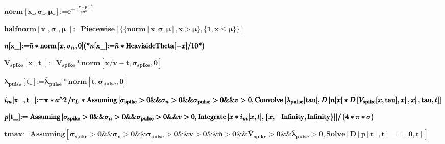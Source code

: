 \documentclass{article}
\begin{document}
\begin{doublespace}
\noindent\(\pmb{\text{norm}[\text{x$\_$},\sigma \_,\mu \_]\text{:=}e^{-\frac{(x-\mu )^2}{2 \sigma ^2}}}\)
\end{doublespace}

\begin{doublespace}
\noindent\(\pmb{\text{halfnorm}[\text{x$\_$},\sigma \_,\mu \_]\text{:=}\text{Piecewise}[\{\{\text{norm}[x,\sigma ,\mu ],x>\mu \},\{1,x\leq \mu \}\}]}\)
\end{doublespace}

\begin{doublespace}
\noindent\(\pmb{n[\text{x$\_$}]\text{:=}\bar{n}*\text{norm}\left[x,\sigma _n,0\right]}\\
\pmb{\text{(*}n[\text{x$\_$}]\text{:=}\bar{n}*\text{HeavisideTheta}[-x]/10\text{*)}}\)
\end{doublespace}

\begin{doublespace}
\noindent\(\pmb{V_{\text{spike}}[\text{x$\_$},\text{t$\_$}]\text{:=}\bar{V}_{\text{spike}}*\text{norm}\left[x/v-t,\sigma _{\text{spike}},0\right]}\)
\end{doublespace}

\begin{doublespace}
\noindent\(\pmb{\lambda _{\text{pulse}}[\text{t$\_$}]\text{:=}\bar{\lambda }_{\text{pulse}}*\text{norm}\left[t,\sigma _{\text{pulse}},0\right]}\)
\end{doublespace}

\begin{doublespace}
\noindent\(\pmb{i_m[\text{x$\_$},\text{t$\_$}]\text{:=}\pi *a{}^{\wedge}2\left/r_L\right.*\text{Assuming}\left[\sigma _{\text{spike}}>0\&\&\sigma
_n>0\&\&\sigma _{\text{pulse}}>0\&\&v>0,\text{Convolve}\left[\lambda _{\text{pulse}}[\text{tau}],D\left[n[x]*D\left[V_{\text{spike}}[x,\text{tau}],x\right],x\right],\text{tau},t\right]\right]}\)
\end{doublespace}

\begin{doublespace}
\noindent\(\pmb{p[\text{t$\_$}]\text{:=}\left.\text{Assuming}\left[\sigma _{\text{spike}}>0\&\&\sigma _n>0\&\&\sigma _{\text{pulse}}>0\&\&v>0,\text{Integrate}\left[x*i_m[x,t],\{x,-\text{Infinity},\text{Infinity}\}\right]\right]\right/(4*\pi
*\sigma )}\)
\end{doublespace}

\begin{doublespace}
\noindent\(\pmb{\text{tmax} \text{:=}\text{Assuming}\left[\sigma _{\text{spike}}>0\&\&\sigma _n>0\&\&\sigma _{\text{pulse}}>0\&\&v>0\&\&\bar{n}>0\&\&
\bar{V}_{\text{spike}}>0\&\& \bar{\lambda }_{\text{pulse}}>0,\text{Solve}[D[p[t],t]==0,t]\right]}\)
\end{doublespace}
\end{document}
